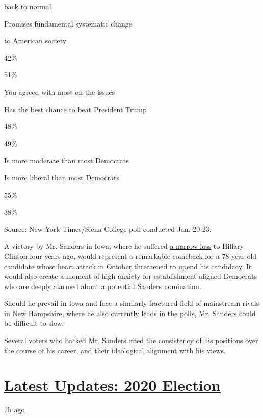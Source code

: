back to normal

Promises fundamental systematic change

to American society

42\%

51\%

You agreed with most on the issues

Has the best chance to beat President Trump

48\%

49\%

Is more moderate than most Democrats

Is more liberal than most Democrats

55\%

38\%

Source: New York Times/Siena College poll conducted Jan. 20-23.

A victory by Mr. Sanders in Iowa, where he suffered
\href{https://www.nytimes3xbfgragh.onion/elections/2016/results/primaries/iowa}{a
narrow loss} to Hillary Clinton four years ago, would represent a
remarkable comeback for a 78-year-old candidate whose
\href{https://www.nytimes3xbfgragh.onion/2019/10/04/us/politics/bernie-sanders-hospital.html}{heart
attack in October} threatened to
\href{https://www.nytimes3xbfgragh.onion/2019/10/07/us/politics/bernie-sanders-heart-attack.html}{upend
his candidacy}. It would also create a moment of high anxiety for
establishment-aligned Democrats who are deeply alarmed about a potential
Sanders nomination.

Should he prevail in Iowa and face a similarly fractured field of
mainstream rivals in New Hampshire, where he also currently leads in the
polls, Mr. Sanders could be difficult to slow.

Several voters who backed Mr. Sanders cited the consistency of his
positions over the course of his career, and their ideological alignment
with his views.

\hypertarget{latest-updates-2020-election}{%
\section{\texorpdfstring{\href{https://www.nytimes3xbfgragh.onion/live/2020/08/19/us/dnc-convention-election?action=click\&pgtype=Article\&state=default\&region=MAIN_CONTENT_1\&context=storylines_live_updates}{Latest
Updates: 2020
Election}}{Latest Updates: 2020 Election}}\label{latest-updates-2020-election}}

\href{https://www.nytimes3xbfgragh.onion/live/2020/08/19/us/dnc-convention-election?action=click\&pgtype=Article\&state=default\&region=MAIN_CONTENT_1\&context=storylines_live_updates\#night-3-featured-more-policy-a-focus-on-women-and-a-full-throated-rejection-of-trump-by-his-predecessor}{7h
ago}


